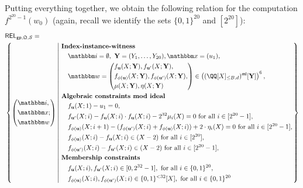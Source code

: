 \documentclass[11pt,letterpaper,usenames,dvipsnames]{article}
\begin{document}
Putting everything together, we obtain the following relation for the computation $f^{2^{20}-1}(w_0)$ (again, recall we identify the sets $\{0,1\}^{20}$ and $[2^20]$):
  \begin{equation*}
  \begin{aligned}
  &\REL_{\gparams,\megaQ,\cS} =\\ &\left\{ \left(\begin{aligned}&\idx,\\ &\inp;\\ &\wit\end{aligned}\right) \left| \ \begin{aligned}
      &\textbf{Index-instance-witness}\\
  &\quad \idx = \emptyset, \ \YY=(Y_1,\ldots, Y_{20}), \inp =(u_1),\\    
      &\quad  \wit = \left(\begin{split}&f_{\uu}(X;\YY), f_{\uu'}(X;\YY),\\ &f_{\phi(\uu)}(X;\YY),  f_{\phi(\uu')}(X;\YY),\\ &\mu(X;\YY), \eta(X;\YY)\end{split}\right) \in \left(\mainQpolyringmultilin[\YY]\right)^{6},\\
      &\textbf{Algebraic constraints mod ideal}\\
      &\quad f_{\uu}(X;1)-u_1 = 0,\\
      &\quad f_{\uu'}(X; i) - f_{\uu}(X;i)\cdot f_{\uu}(X;i) - 2^{32} \mu_i(X) = 0 \text{ for all } i\in [2^{20}-1],\\
      &\quad f_{\phi(\uu)}(X; i+1) - (f_{\phi(\uu')}(X;i) + f_{\phi(\uu)}(X;i)) + 2\cdot \eta_i(X) =0 \text{ for all } i\in [2^{20}-1],\\
      &\quad f_{\phi(\uu)}(X;i)-f_{\uu}(X;i) \in (X-2)\text{ for all } i\in [2^{20}],\\
      &\quad f_{\phi(\uu')}(X;i)-f_{\uu'}(X;i) \in (X-2)\text{ for all } i\in [2^{20}-1],\\
      &\textbf{Membership constraints}\\
      &\quad  f_{\uu}(X;i), f_{\uu'}(X;i) \in [0,2^{32}-1], \text{ for all } i \in \{0,1\}^{20},\\ 
      &\quad f_{\phi(\uu)}(X;i), f_{\phi(\uu')}(X;i) \in \{0,1\}^{<32}[X],  \text{ for all } i \in \{0,1\}^{20}
  \end{aligned} \right.\right\}
  \end{aligned}
  \end{equation*}
\end{document}
